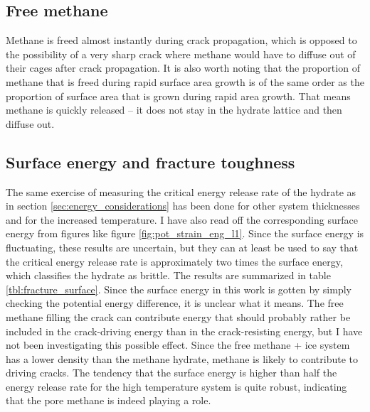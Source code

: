 \subsection{Free methane}
Methane is freed almost instantly during crack propagation, which is opposed to the possibility of a very sharp crack where methane would have to diffuse out of their cages after crack propagation. It is also worth noting that the proportion of methane that is freed during rapid surface area growth is of the same order as the proportion of surface area that is grown during rapid area growth. That means methane is quickly released -- it does not stay in the hydrate lattice and then diffuse out.


\subsection{Surface energy and fracture toughness}
The same exercise of measuring the critical energy release rate of the hydrate as in section \ref{sec:energy_considerations} has been done for other system thicknesses and for the increased temperature. I have also read off the corresponding surface energy from figures like figure \ref{fig:pot_strain_eng_l1}. Since the surface energy is fluctuating, these results are uncertain, but they can at least be used to say that the critical energy release rate is approximately two times the surface energy, which classifies the hydrate as brittle. The results are summarized in table \ref{tbl:fracture_surface}. Since the surface energy in this work is gotten by simply checking the potential energy difference, it is unclear what it means. The free methane filling the crack can contribute energy that should probably rather be included in the crack-driving energy than in the crack-resisting energy, but I have not been investigating this possible effect. Since the free methane + ice system has a lower density than the methane hydrate, methane is likely to contribute to driving cracks. The tendency that the surface energy is higher than half the energy release rate for the high temperature system is quite robust, indicating that the pore methane is indeed playing a role.

